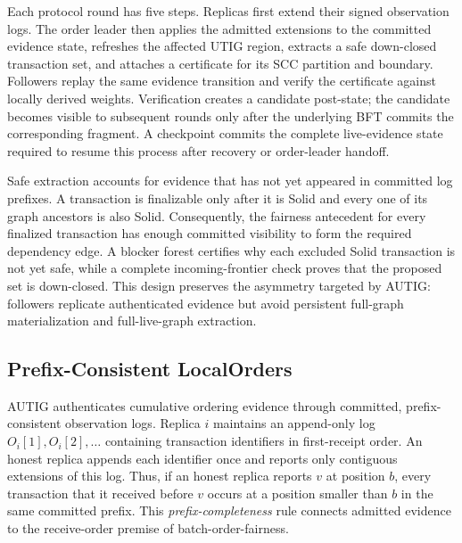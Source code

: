 Each protocol round has five steps.  Replicas first extend their signed
observation logs.  The order leader then applies the admitted extensions to
the committed evidence state, refreshes the affected UTIG region, extracts a
safe down-closed transaction set, and attaches a certificate for its SCC
partition and boundary.  Followers replay the same evidence transition and
verify the certificate against locally derived weights.  Verification creates
a candidate post-state; the candidate becomes visible to subsequent rounds
only after the underlying BFT commits the corresponding fragment.  A
checkpoint commits the complete live-evidence state required to resume this
process after recovery or order-leader handoff.

Safe extraction accounts for evidence that has not yet appeared in committed
log prefixes.  A transaction is finalizable only after it is Solid and every
one of its graph ancestors is also Solid.  Consequently, the fairness
antecedent for every finalized transaction has enough committed visibility to
form the required dependency edge.  A blocker forest certifies why each
excluded Solid transaction is not yet safe, while a complete incoming-frontier
check proves that the proposed set is down-closed.  This design preserves the
asymmetry targeted by AUTIG: followers replicate authenticated evidence but
avoid persistent full-graph materialization and full-live-graph extraction.

\subsection{Prefix-Consistent LocalOrders}
\label{sec:prefix-consistent-localorders}

AUTIG authenticates cumulative ordering evidence through committed,
prefix-consistent observation logs.  Replica $i$ maintains an append-only log
$O_i[1],O_i[2],\ldots$ containing transaction identifiers in first-receipt
order.  An honest replica appends each identifier once and reports only
contiguous extensions of this log.  Thus, if an honest replica reports $v$ at
position $b$, every transaction that it received before $v$ occurs at a
position smaller than $b$ in the same committed prefix.  This
\emph{prefix-completeness} rule connects admitted evidence to the
receive-order premise of batch-order-fairness.

